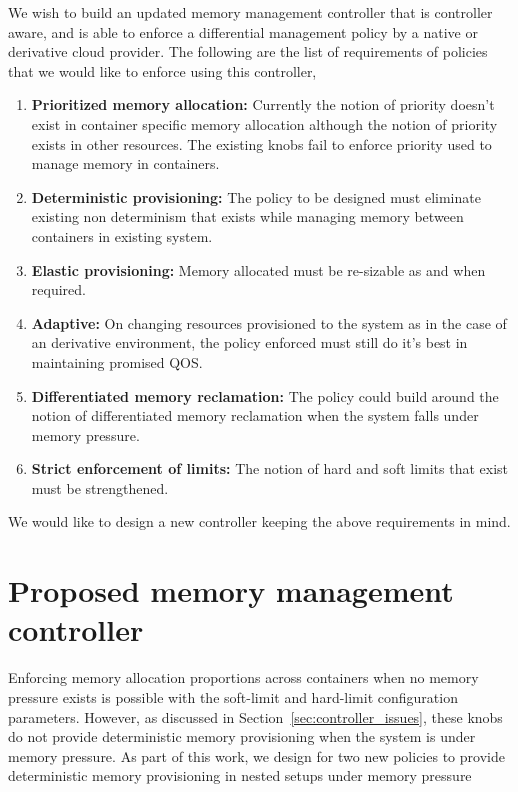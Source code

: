     We wish to build an updated memory management controller that is controller aware, and is able to enforce a differential management
    policy by a native or derivative cloud provider. The following are the list of requirements of policies that we would like to enforce
    using this controller,
  
    \begin{enumerate}
      \item \textbf{Prioritized memory allocation:} Currently the notion of priority doesn't exist in container specific memory allocation 
although the notion of priority exists in other resources. The existing knobs fail to enforce priority used to manage memory in containers. 
      \item \textbf{Deterministic provisioning:} The policy to be designed must eliminate existing non determinism that exists while 
managing memory between containers in existing system.
      \item \textbf{Elastic provisioning:} Memory allocated must be re-sizable as and when required. 
      \item \textbf{Adaptive:} On changing resources provisioned to the system as in the case of an derivative environment, the policy 
enforced must still do it's best in maintaining promised QOS.
      \item \textbf{Differentiated memory reclamation:} The policy could build around the notion of differentiated memory reclamation when 
the system falls under memory pressure.
      \item \textbf{Strict enforcement of limits:} The notion of hard and soft limits that exist must be strengthened.      
    \end{enumerate}
    
  We would like to design a new controller keeping the above requirements in mind.
   
  
  \section{Proposed memory management controller}
      
      Enforcing memory allocation proportions across containers when no memory pressure exists is possible with the soft-limit and hard-limit 
      configuration parameters. However, as discussed in Section~\ref{sec:controller_issues}, these knobs do not provide deterministic memory 
      provisioning when the system is under memory pressure. As part of this work, we design for two new policies to provide deterministic 
      memory provisioning in nested setups under memory pressure
      
